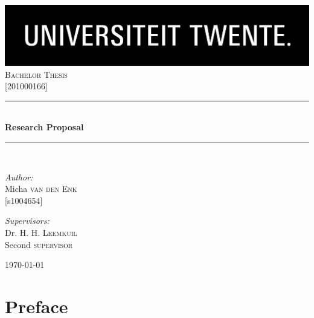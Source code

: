 \documentclass[12pt]{report} %
\newcommand{\HRule}{\rule{\linewidth}{0.5mm}}
\begin{document}
\begin{titlepage}

\begin{center}


\includegraphics[width=1\textwidth]{./logo}\\[1cm]    

\textsc{\Large Bachelor Thesis}\\[0.5cm]
\textsc{\Large {[}201000166{]}}\\[0.5cm]


\HRule \\[0.4cm]
{ \huge \bfseries Research Proposal}\\[0.4cm]

\HRule \\[1.5cm]

\begin{minipage}{0.4\textwidth}
\begin{flushleft} \large
\emph{Author:}\\
Micha \textsc{van den Enk} \\
{[}s1004654{]} \\
\end{flushleft}
\end{minipage}
\begin{minipage}{0.4\textwidth}
\begin{flushright} \large
\emph{Supervisors:} \\
Dr. H. H. \textsc{Leemkuil} \\
Second \textsc{supervisor} \\
\end{flushright}
\end{minipage}

\vfill

{\large \today}

\end{center}

\end{titlepage}

\setcounter{tocdepth}{1}
\tableofcontents

\chapter{Preface}
\end{document}
